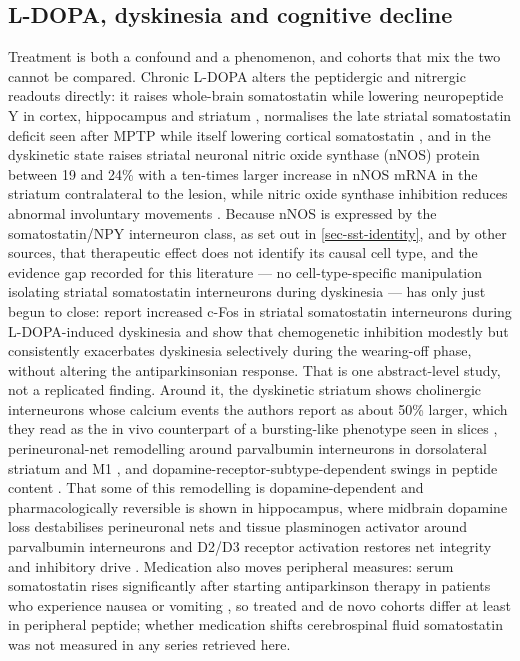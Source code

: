 \documentclass[11pt]{article}
\begin{document}
\subsection{L-DOPA, dyskinesia and cognitive decline}
\label{sec-05-ldopa-dyskinesia}

Treatment is both a confound and a phenomenon, and cohorts that mix the two cannot be compared. Chronic L-DOPA alters the peptidergic and nitrergic readouts directly: it raises whole-brain somatostatin while lowering neuropeptide Y in cortex, hippocampus and striatum \citep{Maeda1993}, normalises the late striatal somatostatin deficit seen after MPTP while itself lowering cortical somatostatin \citep{Asanuma1990}, and in the dyskinetic state raises striatal neuronal nitric oxide synthase (nNOS) protein between 19 and 24\% with a ten-times larger increase in nNOS mRNA in the striatum contralateral to the lesion, while nitric oxide synthase inhibition reduces abnormal involuntary movements \citep{PadovanNeto2011}. Because nNOS is expressed by the somatostatin/NPY interneuron class, as set out in \ref{sec-sst-identity}, and by other sources, that therapeutic effect does not identify its causal cell type, and the evidence gap recorded for this literature --- no cell-type-specific manipulation isolating striatal somatostatin interneurons during dyskinesia --- has only just begun to close: \citet{Stahl2026} report increased c-Fos in striatal somatostatin interneurons during L-DOPA-induced dyskinesia and show that chemogenetic inhibition modestly but consistently exacerbates dyskinesia selectively during the wearing-off phase, without altering the antiparkinsonian response. That is one abstract-level study, not a replicated finding. Around it, the dyskinetic striatum shows cholinergic interneurons whose calcium events the authors report as about 50\% larger, which they read as the in vivo counterpart of a bursting-like phenotype seen in slices \citep{Atamna2025}, perineuronal-net remodelling around parvalbumin interneurons in dorsolateral striatum and M1 \citep{Bilbay2025}, and dopamine-receptor-subtype-dependent swings in peptide content \citep{Engber1992}. That some of this remodelling is dopamine-dependent and pharmacologically reversible is shown in hippocampus, where midbrain dopamine loss destabilises perineuronal nets and tissue plasminogen activator around parvalbumin interneurons and D2/D3 receptor activation restores net integrity and inhibitory drive \citep{Cauzzi2026}. Medication also moves peripheral measures: serum somatostatin rises significantly after starting antiparkinson therapy in patients who experience nausea or vomiting \citep{Shiraishi2010}, so treated and de novo cohorts differ at least in peripheral peptide; whether medication shifts cerebrospinal fluid somatostatin was not measured in any series retrieved here.
\end{document}
